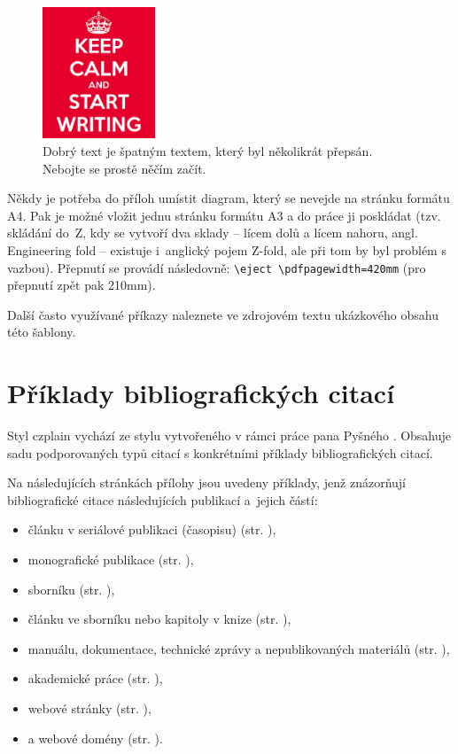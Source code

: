 \begin{figure}[hbt]
	\centering
	\includegraphics[width=0.3\textwidth]{obrazky-figures/keep-calm.png}
	\caption{Dobrý text je špatným textem, který byl několikrát přepsán. Nebojte se prostě něčím začít.}
	\label{keepCalm}
\end{figure}

Někdy je potřeba do příloh umístit diagram, který se nevejde na stránku formátu A4. Pak je možné vložit jednu stránku formátu A3 a do práce ji poskládat (tzv. skládání do~Z, kdy se vytvoří dva sklady -- lícem dolů a lícem nahoru, angl. Engineering fold -- existuje i~anglický pojem Z-fold, ale při tom by byl problém s vazbou). Přepnutí se provádí následovně: \texttt{\textbackslash{}eject \textbackslash{}pdfpagewidth=420mm} (pro přepnutí zpět pak 210mm).

Další často využívané příkazy naleznete ve zdrojovém textu ukázkového obsahu této šablony.



\newcommand{\odradkovani}{\\[0.3em]}

\chapter{Příklady bibliografických citací}
\label{priloha-priklady-citaci}
Styl czplain vychází ze stylu vytvořeného v rámci práce pana Pyšného \cite{Pysny}. Obsahuje sadu podporovaných typů citací s konkrétními příklady bibliografických citací. 

Na následujících stránkách přílohy jsou uvedeny příklady, jenž znázorňují bibliografické citace následujících publikací a~jejich částí:
\begin{itemize}
   \item článku v seriálové publikaci (časopisu) (str. \pageref{pr-casopis-clanek}),
   \item monografické publikace (str. \pageref{pr-monografie}),
   \item sborníku (str. \pageref{pr-sbornik}),
   \item článku ve sborníku nebo kapitoly v knize (str. \pageref{pr-kapitola}),
   \item manuálu, dokumentace, technické zprávy a nepublikovaných materiálů (str. \pageref{pr-manual}),
   \item akademické práce (str. \pageref{pr-thesis}),
   \item webové stránky (str. \pageref{pr-webpage}),
   \item a webové domény (str. \pageref{pr-website}).
\end{itemize}

